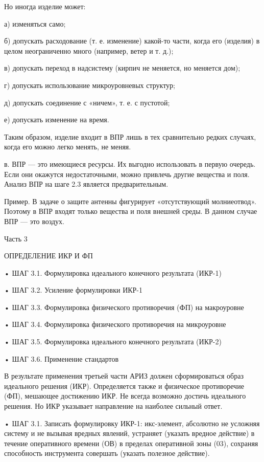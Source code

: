 Но иногда изделие может:

а) изменяться само;

б) допускать расходование (т. е.  изменение) какой-то части, когда его
(изделия) в целом неограниченно много (например, ветер и т. д.);

в) допускать  переход в  надсистему (кирпич  не меняется,  но меняется
дом);

г)  допускать   использование  микроуровневых   структур;

д) допускать соединение с «ничем», т. е. с пустотой;

е) допускать изменение на время.

Таким образом,  изделие входит  в ВПР лишь  в тех  сравнительно редких
случаях, когда его можно легко менять, не меняя.

в.  ВПР —  это имеющиеся  ресурсы.  Их выгодно  использовать в  первую
очередь.  Если  они  окажутся недостаточными,  можно  привлечь  другие
вещества и поля. Анализ ВПР на шаге 2.3 является предварительным.


Пример.   В  задаче   о  защите   антенны  фигурирует   «отсутствующий
молниеотвод».  Поэтому в  ВПР входят  только вещества  и поля  внешней
среды. В данном случае ВПР — это воздух.


Часть 3

ОПРЕДЕЛЕНИЕ ИКР И ФП


• ШАГ 3.1. Формулировка идеального конечного результата (ИКР-1)

• ШАГ 3.2. Усиление формулировки ИКР-1

• ШАГ 3.3. Формулировка физического противоречия
(ФП) на макроуровне

• ШАГ 3.4. Формулировка физического противоречия
на микроуровне

• ШАГ 3.5. Формулировка идеального конечного результата (ИКР-2)

• ШАГ 3.6. Применение стандартов


В результате применения третьей части АРИЗ должен сформироваться образ
идеального решения (ИКР). Определяется также и физическое противоречие
(ФП), мешающее  достижению ИКР. Не всегда  возможно достичь идеального
решения. Но ИКР указывает направление на наиболее сильный ответ.


•  ШАГ 3.1.  Записать  формулировку ИКР-1:  икс-элемент, абсолютно  не
усложняя  систему и  не  вызывая вредных  явлений, устраняет  (указать
вредное  действие)  в течение  оперативного  времени  (ОВ) в  пределах
оперативной  зоны  (03),  сохраняя способность  инструмента  совершать
(указать полезное действие).


